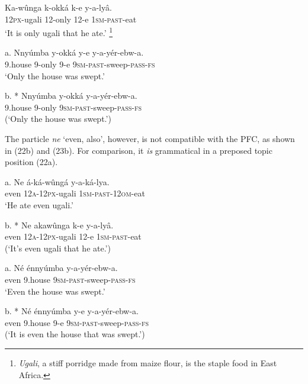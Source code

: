 \documentclass[output=paper]{langsci/langscibook}
\begin{document}
\ea
\gll   Ka-wûnga  k-okká    k-e  y-a-lyâ.{} \\
       \textsc{12px}-ugali  12-only  12-e  \textsc{1sm}-\textsc{past}-eat\\
\glt   ‘It is only ugali that he ate.’{} \footnote{\textit{Ugali}, a stiff porridge made from maize flour, is the staple food in East Africa.}
\z

\ea
\gll   a.  Nnyúmba  y-okká  y-e  y-a-yér-ebw-a.\\
         9.house  9-only  9-e  \textsc{9sm}-\textsc{past}-sweep-\textsc{pass}-\textsc{fs}\\
\glt     ‘Only the house was swept.’
\z

\ea
\gll   b.  * Nnyúmba  y-okká    y-a-yér-ebw-a.\\
         9.house  9-only    \textsc{9sm}-\textsc{past}-sweep-\textsc{pass}-\textsc{fs}\\
\glt     (‘Only the house was swept.’)
\z

The particle \textit{ne} ‘even, also’, however, is not compatible with the PFC, as shown in (22b) and (23b). For comparison, it \textit{is} grammatical in a preposed topic position (22a).

\ea
\gll   a.  Ne  á-ká-wûngá    y-a-ká-lya.\\
         even  \textsc{12a}-\textsc{12px}-ugali  \textsc{1sm}-\textsc{past}-\textsc{12om}-eat\\
\glt     ‘He ate even ugali.’
\z

\ea
\gll   b.  * Ne  akawûnga    k-e  y-a-lyâ.\\
         even  \textsc{12a}-\textsc{12px}-ugali  12-e  \textsc{1sm}-\textsc{past}-eat\\
\glt     (‘It’s even ugali that he ate.’)
\z

\ea
\gll   a.  Né  énnyúmba  y-a-yér-ebw-a.\\
         even  9.house  \textsc{9sm}-\textsc{past}-sweep-\textsc{pass}-\textsc{fs}\\
\glt     ‘Even the house was swept.’
\z

\ea
\gll   b.  * Né  énnyúmba  y-e  y-a-yér-ebw-a.\\
         even  9.house  9-e  \textsc{9sm}-\textsc{past}-sweep-\textsc{pass}-\textsc{fs}\\
\glt     (‘It is even the house that was swept.’)
\z
\end{document}
